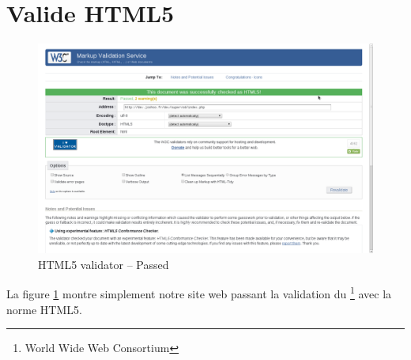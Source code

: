 \documentclass[12pt,a4paper,openany]{book}
\let\pagebreakORIG\pagebreak
\let\clearpageORIG\clearpage
\let\cleardoublepageORIG\cleardoublepage
\newcommand{\removepagebreak}{\renewcommand{\pagebreak}{}\renewcommand{\clearpage}{}\renewcommand{\cleardoublepage}{}}
\newcommand{\restorepagebreak}{\renewcommand{\pagebreak}{\pagebreakORIG}\renewcommand{\clearpage}{\clearpageORIG}\renewcommand{\cleardoublepage}{\cleardoublepageORIG}}
\begin{document}
	\section{Valide HTML5}
	\begin{figure}[H]
		\centering
		\includegraphics[width=17cm]{screens/htmlValidator.png}
		\caption{HTML5 validator -- Passed}
		\label{fig:htmlValidator}
	\end{figure}
	La figure \ref{fig:htmlValidator} montre simplement notre site web passant la validation du \footnote{World Wide Web Consortium} avec la norme
	HTML5.
	\appendix
	\listoffigures
	\removepagebreak
	\vfill
	\lstlistoflistings
	\vfill
	\restorepagebreak
\end{document}
